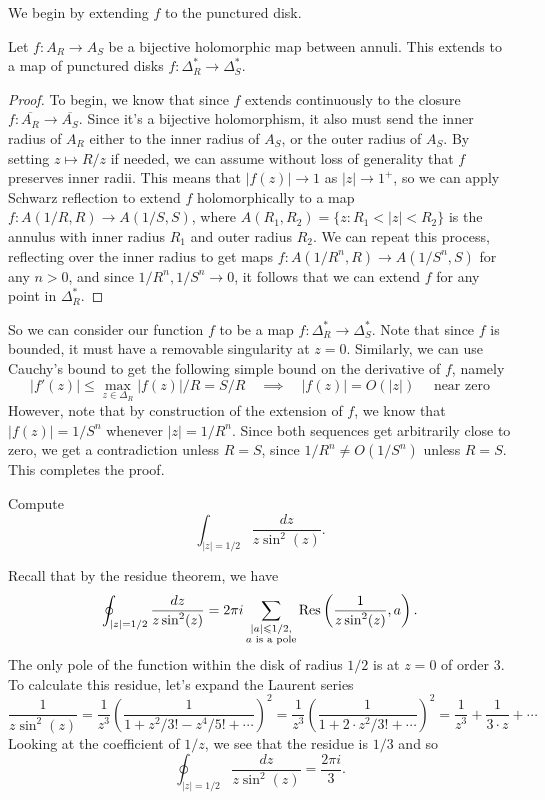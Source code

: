 \documentclass{pset}
\begin{document}
\begin{solution}
  We begin by extending $f$ to the punctured disk.

  \begin{claim}
    Let $f : A_{R} \to A_{S}$ be a bijective holomorphic map between annuli. This extends to a map of punctured disks $f : \Delta_R^* \to \Delta_S^*$.
  \end{claim}

  \begin{proof}
    To begin, we know that since $f$ extends continuously to the closure $f : \overline{A_R} \to \overline{A_S}$. Since it's a bijective holomorphism, it also must send the inner radius of $A_R$ either to the inner radius of $A_S$, or the outer radius of $A_S$. By setting $z \mapsto R/z$ if needed, we can assume without loss of generality that $f$ preserves inner radii. This means that $|f(z)|\to 1$ as $|z|\to 1^+$, so we can apply Schwarz reflection to extend $f$ holomorphically to a map $f: A(1/R, R) \to A(1/S, S)$, where  $A(R_1, R_2) = \{z : R_1 < |z|<R_2\}$ is the annulus with inner radius $R_1$ and outer radius $R_2$. We can repeat this process, reflecting over the inner radius to get maps $f : A(1/R^n, R) \to A(1/S^n, S)$ for any $n>0$, and since $1/R^n, 1/S^n \to 0$, it follows that we can extend $f$ for any point in $\Delta^*_R$.
  \end{proof}

  So we can consider our function $f$ to be a map $f : \Delta^*_R \to \Delta^*_S$. Note that since $f$ is bounded, it must have a removable singularity at $z=0$. Similarly, we can use Cauchy's bound to get the following simple bound on the derivative of $f$, namely
  \[
    |f'(z)|\leq \max_{z\in \Delta_R} |f(z)|/R = S/R \quad\implies \quad |f(z)| = O(|z|)\quad\textrm{ near zero}
  \]
  However, note that by construction of the extension of $f$, we know that $|f(z)|=1/S^n$ whenever $|z|=1/R^n$. Since both sequences get arbitrarily close to zero, we get a contradiction unless $R=S$, since $1/R^n \neq O(1/S^n)$ unless $R=S$. This completes the proof.
\end{solution}

\begin{problem}{1.49}
  Compute
  \[
    \int_{|z|=1/2}\frac{dz}{z\sin^2(z)}.
  \]
\end{problem}

\begin{solution}
  Recall that by the residue theorem, we have
  \[\oint_{|z|=1/2} \frac{dz}{z\sin^2(z)} = 2\pi i\sum_{\substack{|a|\leqslant 1/2,\\ a\textrm{ is a pole}}}\textrm{Res}\left(\frac{1}{z\sin^2(z)}, a\right).\]
  The only pole of the function within the disk of radius $1/2$ is at $z=0$ of order $3$. To calculate this residue, let's expand the Laurent series
  \[
    \frac{1}{z\sin^2(z)} = \frac{1}{z^3}\left(\frac{1}{1+z^2/3!-z^4/5!+\cdots}\right)^2 = \frac{1}{z^3}\left(\frac{1}{1+2\cdot z^2/3! + \cdots}\right)^2 = \frac{1}{z^3}+\frac{1}{3\cdot z}+\cdots
  \]
  Looking at the coefficient of $1/z$, we see that the residue is $1/3$ and so
  \[
    \oint_{|z|=1/2}\frac{dz}{z\sin^2(z)} = \frac{2\pi i}{3}.
  \]
\end{solution}
\end{document}
